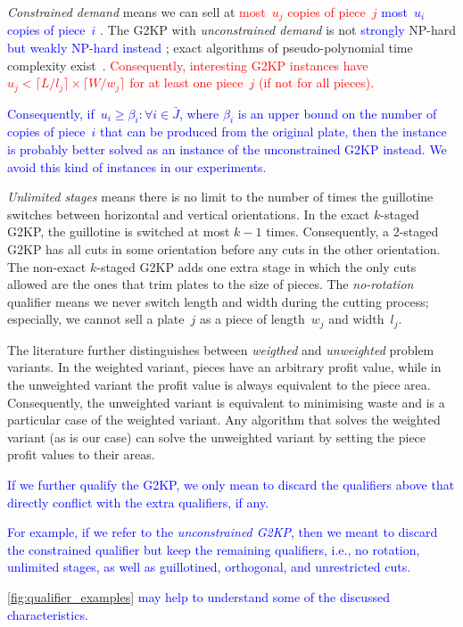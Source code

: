 \documentclass[smallextended]{svjour3}       %
\newif\iffinalversion
\newcommand{\newtext}[1]{\iffinalversion%
#1%
\else%
\textcolor{blue}{#1}%
\fi%
}
\newcommand{\oldtext}[1]{\iffinalversion%
#1%
\else%
\textcolor{red}{#1}%
\fi%
}
\begin{document}
\emph{Constrained demand} means we can sell at \oldtext{most~\(u_j\) copies of piece~\(j\)}\newtext{most~\(u_i\) copies of piece~\(i\)}.
The G2KP with \emph{unconstrained demand} is not \newtext{strongly} NP-hard \newtext{but weakly NP-hard instead}; exact algorithms of pseudo-polynomial time complexity exist~\cite{beasley:1985}.
\oldtext{Consequently, interesting G2KP instances have~\(u_j < \lceil L / l_j \rceil \times \lceil W / w_j \rceil \) for at least one piece~\(j\) (if not for all pieces).}
\newtext{Consequently, if~\(u_i \geq \beta_i : \forall i \in \bar{J}\), where \(\beta_i\) is an upper bound on the number of copies of piece~\(i\) that can be produced from the original plate, then the instance is probably better solved as an instance of the unconstrained G2KP instead. We avoid this kind of instances in our experiments.}
\emph{Unlimited stages} means there is no limit to the number of times the guillotine switches between horizontal and vertical orientations.
In the exact \(k\)-staged G2KP, the guillotine is switched at most \(k-1\) times.
Consequently, a 2-staged G2KP has all cuts in some orientation before any cuts in the other orientation.
The non-exact \(k\)-staged G2KP adds one extra stage in which the only cuts allowed are the ones that trim plates to the size of pieces.
The \emph{no-rotation} qualifier means we never switch length and width during the cutting process; especially, we cannot sell a plate~\(j\) as a piece of length~\(w_j\) and width~\(l_j\).

The literature further distinguishes between \emph{weigthed} and \emph{unweighted} problem variants.
In the weighted variant, pieces have an arbitrary profit value, while in the unweighted variant the profit value is always equivalent to the piece area.
Consequently, the unweighted variant is equivalent to minimising waste and is a particular case of the weighted variant.
Any algorithm that solves the weighted variant (as is our case) can solve the unweighted variant by setting the piece profit values to their areas.

\newtext{If we further qualify the G2KP, we only mean to discard the qualifiers above that directly conflict with the extra qualifiers, if any.}
\newtext{For example, if we refer to the \emph{unconstrained G2KP}, then we meant to discard the constrained qualifier but keep the remaining qualifiers, i.e., no rotation, unlimited stages, as well as guillotined, orthogonal, and unrestricted cuts.}
\newtext{\autoref{fig:qualifier_examples} may help to understand some of the discussed characteristics.}
\end{document}
